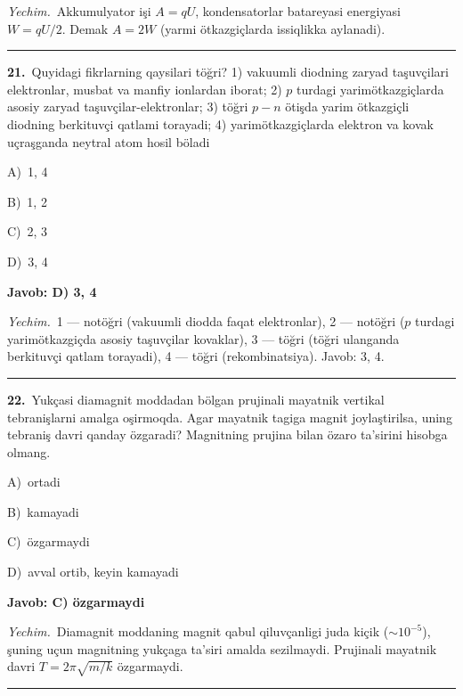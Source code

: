 \documentclass[11pt,a4paper]{article}
\newcommand{\opt}[2]{\hspace*{4mm}#1)\ #2\par}
\begin{document}
\noindent\textit{Yechim.}\ Akkumulyator işi $A=qU$, kondensatorlar batareyasi energiyasi $W=qU/2$. Demak $A=2W$ (yarmi ötkazgiçlarda issiqlikka aylanadi).\par\par\medskip\hrule\medskip
{}\noindent\begin{minipage}{\linewidth}
\textbf{21.}\ Quyidagi fikrlarning qaysilari töğri? 1) vakuumli diodning zaryad taşuvçilari elektronlar, musbat va manfiy ionlardan iborat; 2) $p$ turdagi yarimötkazgiçlarda asosiy zaryad taşuvçilar-elektronlar; 3) töğri $p-n$ ötişda yarim ötkazgiçli diodning berkituvçi qatlami torayadi; 4) yarimötkazgiçlarda elektron va kovak uçraşganda neytral atom hosil böladi\par\smallskip
\opt{A}{1, 4}
\opt{B}{1, 2}
\opt{C}{2, 3}
\opt{D}{3, 4}
\end{minipage}\vspace{2pt}\par
\noindent\colorbox{gray!12}{\parbox{\dimexpr\linewidth-2\fboxsep}{\textbf{Javob: D) 3, 4}}}\par\smallskip
\noindent\textit{Yechim.}\ 1 — notöğri (vakuumli diodda faqat elektronlar), 2 — notöğri ($p$ turdagi yarimötkazgiçda asosiy taşuvçilar kovaklar), 3 — töğri (töğri ulanganda berkituvçi qatlam torayadi), 4 — töğri (rekombinatsiya). Javob: 3, 4.\par\par\medskip\hrule\medskip
{}\noindent\begin{minipage}{\linewidth}
\textbf{22.}\ Yukçasi diamagnit moddadan bölgan prujinali mayatnik vertikal tebranişlarni amalga oşirmoqda. Agar mayatnik tagiga magnit joylaştirilsa, uning tebraniş davri qanday özgaradi? Magnitning prujina bilan özaro ta’sirini hisobga olmang.\par\smallskip
\opt{A}{ortadi}
\opt{B}{kamayadi}
\opt{C}{özgarmaydi}
\opt{D}{avval ortib, keyin kamayadi}
\end{minipage}\vspace{2pt}\par
\noindent\colorbox{gray!12}{\parbox{\dimexpr\linewidth-2\fboxsep}{\textbf{Javob: C) özgarmaydi}}}\par\smallskip
\noindent\textit{Yechim.}\ Diamagnit moddaning magnit qabul qiluvçanligi juda kiçik ($\sim10^{-5}$), şuning uçun magnitning yukçaga ta’siri amalda sezilmaydi. Prujinali mayatnik davri $T=2\pi\sqrt{m/k}$ özgarmaydi.\par\par\medskip\hrule\medskip
\end{document}
